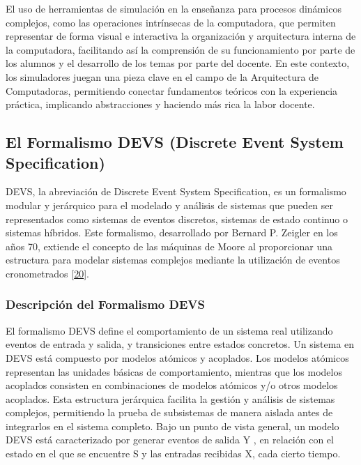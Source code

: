 \documentclass[12pt,twoside]{templates/unerthesis}
\begin{document}
El uso de herramientas de simulación en la enseñanza para procesos dinámicos complejos, como las operaciones intrínsecas de la computadora, que permiten representar de forma visual e interactiva la organización y arquitectura interna de la computadora, facilitando así la comprensión de su funcionamiento por parte de los alumnos y el desarrollo de los temas por parte del docente. En este contexto, los simuladores juegan una pieza clave en el campo de la Arquitectura de Computadoras, permitiendo conectar fundamentos teóricos con la experiencia práctica, implicando abstracciones y haciendo más rica la labor docente.

\hypertarget{el-formalismo-devs-discrete-event-system-specification}{%
\subsection{El Formalismo DEVS (Discrete Event System Specification)}\label{el-formalismo-devs-discrete-event-system-specification}}

DEVS, la abreviación de Discrete Event System Specification, es un formalismo modular y jerárquico para el modelado y análisis de sistemas que pueden ser representados como sistemas de eventos discretos, sistemas de estado continuo o sistemas híbridos. Este formalismo, desarrollado por Bernard P. Zeigler en los años 70, extiende el concepto de las máquinas de Moore al proporcionar una estructura para modelar sistemas complejos mediante la utilización de eventos cronometrados {[}\protect\hyperlink{ref-zeigler_theory_2000}{20}{]}.

\hypertarget{descripciuxf3n-del-formalismo-devs}{%
\subsubsection{Descripción del Formalismo DEVS}\label{descripciuxf3n-del-formalismo-devs}}

El formalismo DEVS define el comportamiento de un sistema real utilizando eventos de entrada y salida, y transiciones entre estados concretos. Un sistema en DEVS está compuesto por modelos atómicos y acoplados. Los modelos atómicos representan las unidades básicas de comportamiento, mientras que los modelos acoplados consisten en combinaciones de modelos atómicos y/o otros modelos acoplados. Esta estructura jerárquica facilita la gestión y análisis de sistemas complejos, permitiendo la prueba de subsistemas de manera aislada antes de integrarlos en el sistema completo.
Bajo un punto de vista general, un modelo DEVS está caracterizado por generar eventos de salida Y , en relación con el estado en el que se encuentre S y las entradas recibidas X, cada cierto tiempo.
\end{document}
